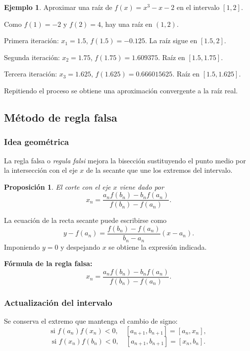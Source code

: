 \documentclass[a4paper,12pt]{article}
\theoremstyle{definition}
\newtheorem{ejemplo}{Ejemplo}[section]
\theoremstyle{plain}
\newtheorem{proposicion}{Proposición}[section]
\begin{document}
\begin{ejemplo}
Aproximar una raíz de $f(x)=x^3-x-2$ en el intervalo $[1,2]$.

Como $f(1)=-2$ y $f(2)=4$, hay una raíz en $(1,2)$.

Primera iteración:
$x_1=1.5$, $f(1.5)=-0.125$. La raíz sigue en $[1.5,2]$.

Segunda iteración:
$x_2=1.75$, $f(1.75)=1.609375$. Raíz en $[1.5,1.75]$.

Tercera iteración:
$x_3=1.625$, $f(1.625)=0.666015625$. Raíz en $[1.5,1.625]$.

Repitiendo el proceso se obtiene una aproximación convergente a la raíz real.
\end{ejemplo}

\subsection{Método de regla falsa}

\subsubsection{Idea geométrica}

La regla falsa o \emph{regula falsi} mejora la bisección sustituyendo el punto
medio por la intersección con el eje $x$ de la secante que une los extremos del
intervalo.

\begin{proposicion}
El corte con el eje $x$ viene dado por
\[
x_n = \frac{a_n f(b_n)-b_n f(a_n)}{f(b_n)-f(a_n)}.
\]
\end{proposicion}

\begin{demostracion}
La ecuación de la recta secante puede escribirse como
\[
y-f(a_n)=\frac{f(b_n)-f(a_n)}{b_n-a_n}(x-a_n).
\]
Imponiendo $y=0$ y despejando $x$ se obtiene la expresión indicada.
\end{demostracion}

\begin{cajaresultado}
\textbf{Fórmula de la regla falsa:}
\[
x_n = \frac{a_n f(b_n)-b_n f(a_n)}{f(b_n)-f(a_n)}.
\]
\end{cajaresultado}

\subsubsection{Actualización del intervalo}

Se conserva el extremo que mantenga el cambio de signo:
\[
\text{si } f(a_n)f(x_n)<0,\quad [a_{n+1},b_{n+1}]=[a_n,x_n],
\]
\[
\text{si } f(x_n)f(b_n)<0,\quad [a_{n+1},b_{n+1}]=[x_n,b_n].
\]
\end{document}
